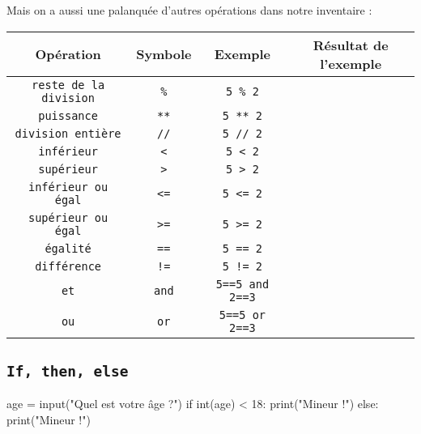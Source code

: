 \documentclass[12pt,a4paper, oneside]{article}
\theoremstyle{definition}
\begin{document}
      Mais on a aussi une palanquée d'autres opérations dans notre inventaire :
      \begin{center}
      \begin{tabular}{|c|c|c|c|}
        \hline
        \textbf{Opération} & \textbf{Symbole} & \textbf{Exemple} & \textbf{Résultat de l'exemple} \\
        \hline
         \texttt{reste de la division} & \texttt{\%} & \texttt{5 \% 2} & \\
        \hline
         \texttt{puissance} & \texttt{**} & \texttt{5 ** 2} & \\
        \hline
         \texttt{division entière} & \texttt{//} & \texttt{5 // 2} & \\
        \hline
         \texttt{inférieur} & \texttt{<} & \texttt{5 < 2} & \\
        \hline
         \texttt{supérieur} & \texttt{>} & \texttt{5 > 2} & \\
        \hline
         \texttt{inférieur ou égal} & \texttt{<=} & \texttt{5 <= 2} & \\
        \hline
         \texttt{supérieur ou égal} & \texttt{>=} & \texttt{5 >= 2} & \\
        \hline
         \texttt{égalité} & \texttt{==} & \texttt{5 == 2} & \\
        \hline
         \texttt{différence} & \texttt{!=} & \texttt{5 != 2} & \\
        \hline
         \texttt{et} & \texttt{and} & \texttt{5==5 and 2==3} & \\
        \hline
         \texttt{ou} & \texttt{or} & \texttt{5==5 or 2==3} & \\
        \hline
      \end{tabular}
      \end{center}



   \subsection{\texttt{If, then, else}}
   \begin{minipage}{.4\textwidth}
    \begin{pyverbatim}
   age = input("Quel est votre âge ?")
   if int(age) < 18:
     print("Mineur !")
   else:
     print("Mineur !")
    \end{pyverbatim}
   \end{minipage}
   \hfill\begin{minipage}{.4\textwidth}
     \begin{center}
       \begin{scratch}[scale=.8]
       \end{scratch}
     \end{center}
   \end{minipage}
\end{document}
